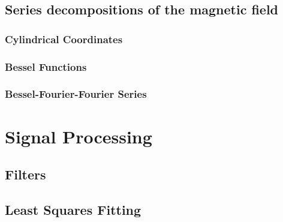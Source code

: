 \subsection{Series decompositions of the magnetic field}
\subsubsection{Cylindrical Coordinates}
\subsubsection{Bessel Functions}
\subsubsection{Bessel-Fourier-Fourier Series}

\section{Signal Processing}
\subsection{Filters}
\subsection{Least Squares Fitting}
